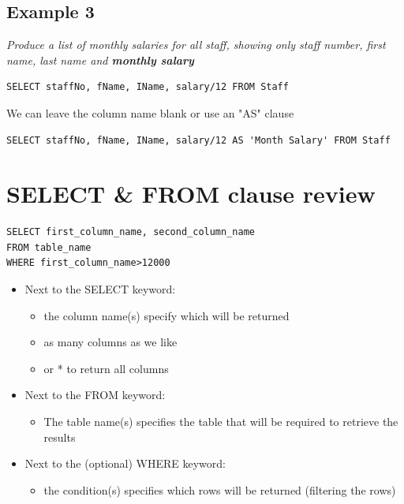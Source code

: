 \documentclass{article}[18pt]
\begin{document}
\subsection{Example 3}
\textit{Produce a list of monthly salaries for all staff, showing only staff number, first name, last name and \textbf{monthly salary}}
\begin{verbatim}
SELECT staffNo, fName, IName, salary/12 FROM Staff
\end{verbatim}
We can leave the column name blank or use an "AS" clause
\begin{verbatim}
SELECT staffNo, fName, IName, salary/12 AS 'Month Salary' FROM Staff
\end{verbatim}
\section{SELECT \& FROM clause review}
\begin{verbatim}
SELECT first_column_name, second_column_name
FROM table_name
WHERE first_column_name>12000
\end{verbatim}
\begin{itemize}
	\item Next to the SELECT keyword:
	\begin{itemize}
		\item the column name(s) specify which will be returned
		\item as many columns as we like
		\item or * to return all columns
	\end{itemize}
	\item Next to the FROM keyword:
	\begin{itemize}
		\item The table name(s) specifies the table that will be required to retrieve the results
	\end{itemize}
	\item Next to the (optional) WHERE keyword:
	\begin{itemize}
		\item the condition(s) specifies which rows will be returned (filtering the rows)
	\end{itemize}
\end{itemize}
\end{document}
